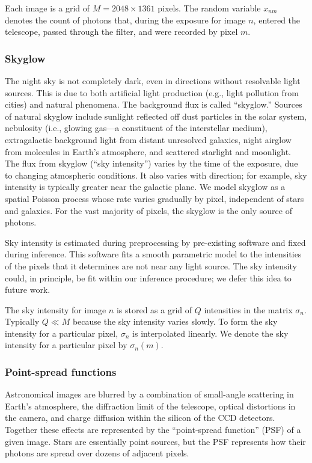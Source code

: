 Each image is a grid of $M=2048 \times 1361$ pixels.
The random variable $x_{nm}$ denotes the count of photons that, during the exposure for image $n$, entered the telescope, passed through the filter, and were recorded by pixel $m$.


\subsubsection{Skyglow}

The night sky is not completely dark, even in directions without resolvable light sources. This is due to both artificial light production (e.g., light pollution from cities) and natural phenomena.
The background flux is called ``skyglow.''
Sources of natural skyglow include sunlight reflected off dust particles in the solar system, nebulosity (i.e., glowing gas---a constituent of the interstellar medium), extragalactic background light from distant unresolved galaxies, night airglow from molecules in Earth's atmosphere, and scattered starlight and moonlight.
The flux from skyglow (``sky intensity'') varies by the time of the exposure, due to changing atmospheric conditions.
It also varies with direction; for example, sky intensity is typically greater near the galactic plane.
We model skyglow as a spatial Poisson process whose rate varies gradually by pixel, independent of stars and galaxies.
For the vast majority of pixels, the skyglow is the only source of photons.

Sky intensity is estimated during preprocessing by pre-existing software \citep{bertin1996sextractor} and fixed during inference.
This software fits a smooth parametric model to the intensities of the pixels that it determines are not near any light source.
The sky intensity could, in principle, be fit within our inference procedure; we defer this idea to future work.

The sky intensity for image $n$ is stored as a grid of $Q$ intensities in the matrix $\sigma_n$.
Typically $Q \ll M$ because the sky intensity varies slowly.
To form the sky intensity for a particular pixel, $\sigma_n$ is interpolated linearly.
We denote the sky intensity for a particular pixel by $\sigma_{n}(m)$.


\subsubsection{Point-spread functions}

Astronomical images are blurred by a combination of small-angle scattering in Earth's atmosphere, the diffraction limit of the telescope, optical distortions in the camera, and charge diffusion within the silicon of the CCD detectors. Together these effects are represented by the ``point-spread function'' (PSF) of a given image. Stars are essentially point sources, but the PSF represents how their photons are spread over dozens of adjacent pixels.

